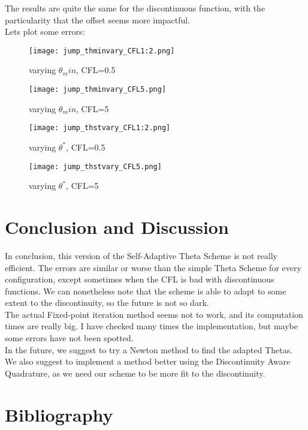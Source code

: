 \documentclass[12pt]{article}
\begin{document}
The results are quite the same for the discontinuous function, with the particularity that the offset seems more impactful.\\
Lets plot some errors:

\begin{figure}[H]
    \centering
    \texttt{[image: jump\_thminvary\_CFL1:2.png]}
    \caption{varying $\theta_min$, CFL=0.5}
\end{figure}

\begin{figure}[H]
    \centering
    \texttt{[image: jump\_thminvary\_CFL5.png]}
    \caption{varying $\theta_min$, CFL=5}
\end{figure}

\begin{figure}[H]
    \centering
    \texttt{[image: jump\_thstvary\_CFL1:2.png]}
    \caption{varying $\theta^*$, CFL=0.5}
\end{figure}

\begin{figure}[H]
    \centering
    \texttt{[image: jump\_thstvary\_CFL5.png]}
    \caption{varying $\theta^*$, CFL=5}
\end{figure}

\section{Conclusion and Discussion}
In conclusion, this version of the Self-Adaptive Theta Scheme is not really efficient. The errors are similar or worse than the simple Theta Scheme for every configuration, except sometimes when the CFL is bad with discontinuous functions.
We can nonetheless note that the scheme is able to adapt to some extent to the discontinuity, so the future is not so dark.\\
The actual Fixed-point iteration method seems not to work, and its computation times are really big. I have checked many times the implementation, but maybe some errors have not been spotted.\\
In the future, we suggest to try a Newton method to find the adapted Thetas. We also suggest to implement a method better using the Discontinuity Aware Quadrature, as we need our scheme to be more fit to the discontinuity.

\section{Bibliography}
\end{document}
